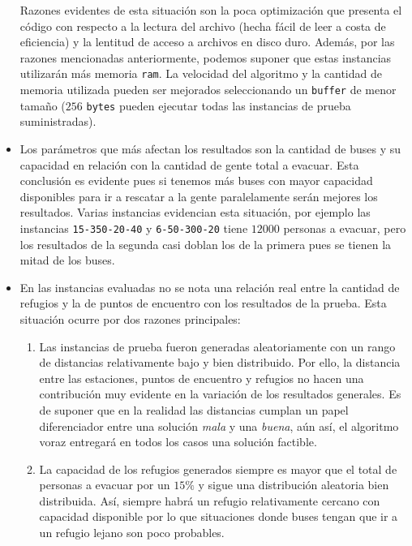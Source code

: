 \documentclass[letter, 10pt]{article}
\begin{document}
\begin{itemize}
            Razones evidentes de esta situación son la poca
            optimización que presenta el código con respecto a la lectura del
            archivo (hecha fácil de leer a costa de eficiencia) y la lentitud de
            acceso a archivos en disco duro. Además, por las razones mencionadas
            anteriormente, podemos suponer que estas instancias utilizarán más
            memoria \texttt{ram}. La velocidad del algoritmo y la cantidad de
            memoria utilizada pueden ser mejorados seleccionando un
            \texttt{buffer} de menor tamaño ($256$ \texttt{bytes} pueden ejecutar
            todas las instancias de prueba suministradas). 
        \item
            Los parámetros que más afectan los resultados son la cantidad de
            buses y su capacidad en relación con la cantidad de gente total a
            evacuar. Esta conclusión es evidente pues si tenemos más buses con
            mayor capacidad disponibles para ir a rescatar a la gente
            paralelamente serán mejores los resultados. Varias instancias
            evidencian esta situación, por ejemplo las instancias
            \texttt{15-350-20-40} y \texttt{6-50-300-20} tiene $12000$ personas
            a evacuar, pero los resultados de la segunda casi doblan los de la
            primera pues se tienen la mitad de los buses. 
        \item 
            En las instancias evaluadas no se nota una relación real entre la
            cantidad de refugios y la de puntos de encuentro con los resultados
            de la prueba. Esta situación ocurre por dos razones principales:
            \begin{enumerate}
                \item
                    Las instancias de prueba fueron generadas aleatoriamente con
                    un rango de distancias relativamente bajo y bien
                    distribuido. Por ello, la distancia entre las estaciones,
                    puntos de encuentro y refugios no hacen una contribución muy
                    evidente en la variación de los resultados generales. Es de
                    suponer que en la realidad las distancias cumplan un papel
                    diferenciador entre una solución \emph{mala} y una
                    \emph{buena}, aún así, el algoritmo voraz entregará en todos
                    los casos una solución factible.
                \item
                    La capacidad de los refugios generados siempre es mayor que
                    el total de personas a evacuar por un $15\%$ y sigue una
                    distribución aleatoria bien distribuida. Así, siempre habrá
                    un refugio relativamente cercano con capacidad disponible
                    por lo que situaciones donde buses tengan que ir a un
                    refugio lejano son poco probables.
            \end{enumerate}
    \end{itemize}
\end{document}
